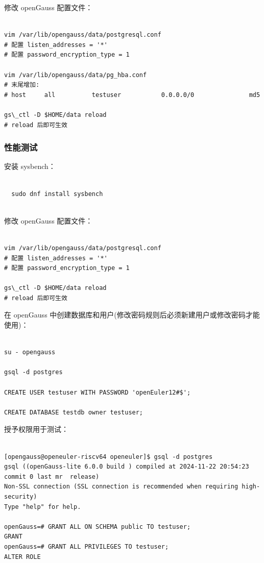 \documentclass{article}
\begin{document}
修改 openGauss 配置文件：

\begin{verbatim}
  
vim /var/lib/opengauss/data/postgresql.conf
# 配置 listen_addresses = '*'
# 配置 password_encryption_type = 1

vim /var/lib/opengauss/data/pg_hba.conf
# 末尾增加: 
# host     all          testuser           0.0.0.0/0               md5

gs\_ctl -D $HOME/data reload
# reload 后即可生效

\end{verbatim}

\subsubsection{性能测试}

安装 sysbench：

\begin{verbatim}
  
  sudo dnf install sysbench
  
\end{verbatim}

修改 openGauss 配置文件：

\begin{verbatim}
  
vim /var/lib/opengauss/data/postgresql.conf
# 配置 listen_addresses = '*'
# 配置 password_encryption_type = 1

gs\_ctl -D $HOME/data reload
# reload 后即可生效

\end{verbatim}

在 openGauss 中创建数据库和用户(修改密码规则后必须新建用户或修改密码才能使用)：

\begin{verbatim}
  
su - opengauss

gsql -d postgres

CREATE USER testuser WITH PASSWORD 'openEuler12#$';

CREATE DATABASE testdb owner testuser;

\end{verbatim}

授予权限用于测试：

\begin{verbatim}
  
[opengauss@openeuler-riscv64 openeuler]$ gsql -d postgres
gsql ((openGauss-lite 6.0.0 build ) compiled at 2024-11-22 20:54:23 commit 0 last mr  release)
Non-SSL connection (SSL connection is recommended when requiring high-security)
Type "help" for help.

openGauss=# GRANT ALL ON SCHEMA public TO testuser;
GRANT
openGauss=# GRANT ALL PRIVILEGES TO testuser; 
ALTER ROLE

\end{verbatim}
\end{document}
